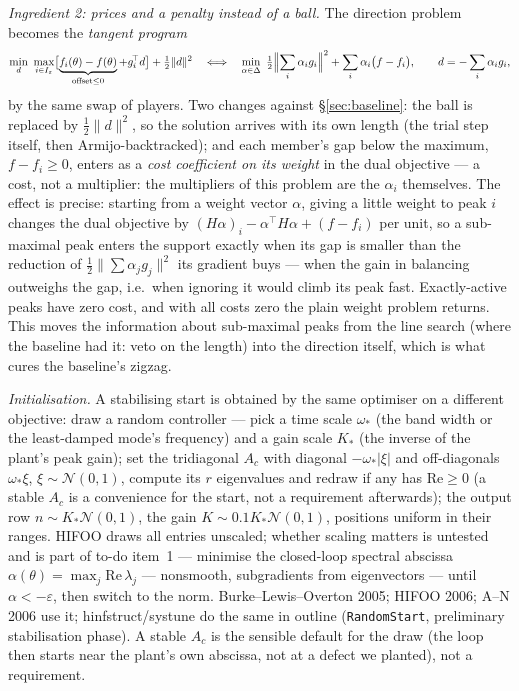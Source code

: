 \documentclass[11pt,a4paper]{article}
\newcommand{\eps}{\varepsilon}
\newcommand{\code}[1]{\texttt{#1}}
\newcommand{\T}{^{\!\top}}
\newcommand{\rev}[1]{#1}
\newcommand{\revb}[1]{#1}
\begin{document}
\emph{Ingredient 2: prices and a penalty instead of a ball.}  The direction problem
becomes the \emph{tangent program}
\[
\min_d\ \max_{i\in I_\eps}\bigl[\underbrace{f_i(\theta)-f(\theta)}_{\text{offset}\le0}+g_i\T d\bigr]+\tfrac12\|d\|^2
\quad\Longleftrightarrow\quad
\min_{\alpha\in\Delta}\ \tfrac12\Bigl\|\sum_i\alpha_ig_i\Bigr\|^2+\sum_i\alpha_i\bigl(f-f_i\bigr),
\qquad d=-\sum_i\alpha_ig_i,
\]
by the same swap of players.  Two changes against \S\ref{sec:baseline}: the ball is
replaced by $\tfrac12\|d\|^2$, so the solution arrives with its own length (the trial
step itself, then Armijo-backtracked); \rev{and each member's gap below the maximum, $f-f_i\ge0$, enters as a \emph{cost
coefficient on its weight} in the dual objective --- a cost, not a multiplier: the
multipliers of this problem are the $\alpha_i$ themselves.  The effect is precise:
starting from a weight vector $\alpha$, giving a little weight to peak $i$ changes the
dual objective by $(H\alpha)_i-\alpha\T H\alpha+(f-f_i)$ per unit, so a sub-maximal
peak enters the support exactly when its gap is smaller than the reduction of
$\tfrac12\|\sum\alpha_jg_j\|^2$ its gradient buys --- when the gain in balancing
outweighs the gap, i.e.\ when ignoring it would climb its peak fast.  Exactly-active
peaks have zero cost, and with all costs zero the plain weight problem returns.}  This moves the information about
sub-maximal peaks from the line search (where the baseline had it: veto on the length)
into the direction itself, which is what cures the baseline's zigzag.

\emph{Initialisation.}  A stabilising start is obtained by the same optimiser on a
different objective: \rev{\revb{draw a random controller --- pick a time scale $\omega_\ast$ (the band width or
the least-damped mode's frequency) and a gain scale $K_\ast$ (the inverse of the plant's
peak gain); set the tridiagonal $A_c$ with diagonal $-\omega_\ast|\xi|$ and
off-diagonals $\omega_\ast\xi$, $\xi\sim\mathcal N(0,1)$, compute its $r$ eigenvalues
and redraw if any has $\mathrm{Re}\ge0$ (a stable $A_c$ is a convenience for the start,
not a requirement afterwards); the output row $n\sim K_\ast\mathcal N(0,1)$, the gain
$K\sim0.1K_\ast\mathcal N(0,1)$, positions uniform in their ranges.  HIFOO draws all
entries unscaled; whether scaling matters is untested and is part of to-do item~1 ---}}
minimise the closed-loop spectral abscissa $\alpha(\theta)=\max_j\mathrm{Re}\,\lambda_j$
--- nonsmooth, subgradients from eigenvectors --- until $\alpha<-\eps$, then switch to
the norm.  Burke--Lewis--Overton 2005; HIFOO 2006; A--N 2006 use it; hinfstruct/systune
do the same in outline (\code{RandomStart}, preliminary stabilisation phase).  A stable
$A_c$ is the sensible default for the draw (the loop then starts near the plant's own
abscissa, not at a defect we planted), not a requirement.
\end{document}
